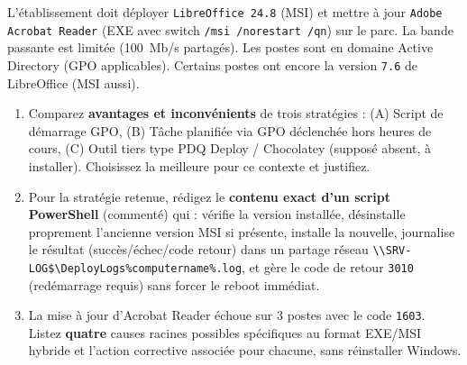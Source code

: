 \documentclass[11pt]{article}
\begin{document}
\begin{exercice}
L'établissement doit déployer \texttt{LibreOffice 24.8} (MSI) et mettre à jour \texttt{Adobe Acrobat Reader} (EXE avec switch \texttt{/msi /norestart /qn}) sur le parc. La bande passante est limitée (\SI{100}{Mb/s} partagés). Les postes sont en domaine Active Directory (GPO applicables). Certains postes ont encore la version \texttt{7.6} de LibreOffice (MSI aussi).
\begin{enumerate}
    \item Comparez \textbf{avantages et inconvénients} de trois stratégies : (A) Script de démarrage GPO, (B) Tâche planifiée via GPO déclenchée hors heures de cours, (C) Outil tiers type PDQ Deploy / Chocolatey (supposé absent, à installer). Choisissez la meilleure pour ce contexte et justifiez.
    \item Pour la stratégie retenue, rédigez le \textbf{contenu exact d'un script PowerShell} (commenté) qui : vérifie la version installée, désinstalle proprement l'ancienne version MSI si présente, installe la nouvelle, journalise le résultat (succès/échec/code retour) dans un partage réseau \texttt{\textbackslash\textbackslash SRV-LOG\$\textbackslash DeployLogs\%computername\%.log}, et gère le code de retour \texttt{3010} (redémarrage requis) sans forcer le reboot immédiat.
    \item La mise à jour d'Acrobat Reader échoue sur \num{3} postes avec le code \texttt{1603}. Listez \textbf{quatre} causes racines possibles spécifiques au format EXE/MSI hybride et l'action corrective associée pour chacune, sans réinstaller Windows.
\end{enumerate}
\end{exercice}
\end{document}
